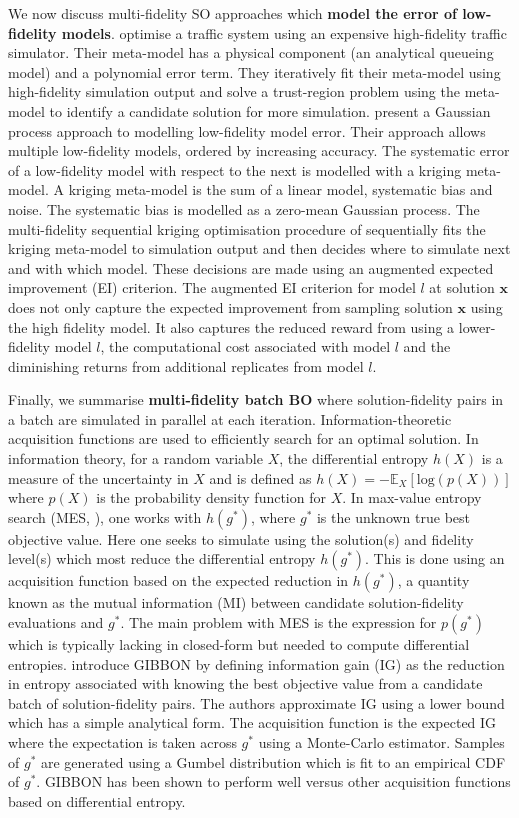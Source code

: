 \documentclass[12pt,a4paper]{article}
\begin{document}
We now discuss multi-fidelity SO approaches which \textbf{model the error of low-fidelity models}. \cite{chong2018simulation} optimise a traffic system using an expensive high-fidelity traffic simulator. Their meta-model has a physical component (an analytical queueing model) and a polynomial error term. They iteratively fit their meta-model using high-fidelity simulation output and solve a trust-region problem using the meta-model to identify a candidate solution for more simulation. \cite{huang2006sequential} present a Gaussian process approach to modelling low-fidelity model error. Their approach allows multiple low-fidelity models, ordered by increasing accuracy. The systematic error of a low-fidelity model with respect to the next is modelled with a kriging meta-model. A kriging meta-model is the sum of a linear model, systematic bias and noise. The systematic bias is modelled as a zero-mean Gaussian process. The multi-fidelity sequential kriging optimisation procedure of \cite{huang2006sequential} sequentially fits the kriging meta-model to simulation output and then decides where to simulate next and with which model. These decisions are made using an augmented expected improvement (EI) criterion. The augmented EI criterion for model $l$ at solution $\boldsymbol{x}$ does not only capture the expected improvement from sampling solution $\boldsymbol{x}$ using the high fidelity model. It also captures the reduced reward from using a lower-fidelity model $l$, the computational cost associated with model $l$ and the diminishing returns from additional replicates from model $l$.

Finally, we summarise \textbf{multi-fidelity batch BO} where solution-fidelity pairs in a batch are simulated in parallel at each iteration. Information-theoretic acquisition functions are used to efficiently search for an optimal solution. In information theory, for a random variable $X$, the differential entropy $h(X)$ is a measure of the uncertainty in $X$ and is defined as $h(X) = -\mathbb{E}_{X}[\text{log}(p(X))]$ where $p(X)$ is the probability density function for $X$. In max-value entropy search (MES, \cite{wang2017max}), one works with $h(g^{*})$, where $g^{*}$ is the unknown true best objective value. Here one seeks to simulate using the solution(s) and fidelity level(s) which most reduce the differential entropy  $h(g^{*})$. This is done using an acquisition function based on the expected reduction in $h(g^{*})$, a quantity known as the mutual information (MI) between candidate solution-fidelity evaluations and $g^{*}$. The main problem with MES is the expression for $p(g^{*})$ which is typically lacking in closed-form but needed to compute differential entropies. \cite{moss2021gibbon} introduce GIBBON by defining information gain (IG) as the reduction in entropy associated with knowing the best objective value from a candidate batch of solution-fidelity pairs. The authors approximate IG using a lower bound which has a simple analytical form. The acquisition function is the expected IG where the expectation is taken across $g^{*}$ using a Monte-Carlo estimator. Samples of $g^{*}$ are generated using a Gumbel distribution which is fit to an empirical CDF of $g^{*}$. GIBBON has been shown to perform well versus other acquisition functions based on differential entropy. 
\end{document}
